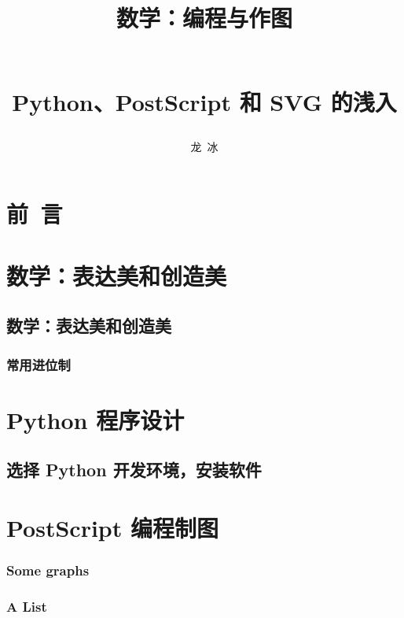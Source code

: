\documentclass[zihao=-4,heading=true,a4paper,twoside,openany]{ctexbook}
\title{\begin{kaishu}数学：编程与作图\end{kaishu}\\
	Python、PostScript 和 SVG 的浅入}
\author{\kaishu 龙\,  冰}
\date{}
\begin{document}
\begin{titlepage}
	\maketitle
\end{titlepage}
\tableofcontents
\part*{\kaishu 前\, 言}%


\part{数学：表达美和创造美}
\chapter{数学：表达美和创造美}%




\section{常用进位制}\label{sec:II.2}


\part{Python 程序设计}
\chapter{选择 Python 开发环境，安装软件}\label{sec:II.2}




\newpage\part{PostScript 编程制图}
\section{Some graphs}


\section{A List}


\printindex
\printbibliography
\end{document}
